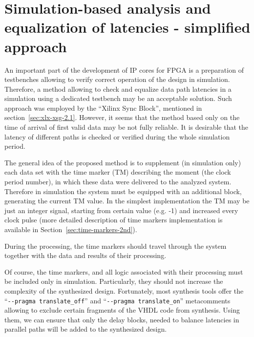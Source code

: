\documentclass[preprint,11pt]{elsarticle}
\begin{document}
\section{Simulation-based analysis and equalization of latencies - simplified approach}
An important part of the development of IP cores for FPGA is a preparation of 
testbenches allowing to verify correct operation of the design in simulation.
Therefore, a method allowing to check and equalize data path latencies in a simulation using
a dedicated testbench may be an acceptable solution.
Such approach was employed by the ``Xilinx Sync Block'', mentioned in section~\ref{sec:xlx-xsg-2.1}.
However, it seems that the method based only on the time of arrival of first valid data 
may be not fully reliable. It is desirable that the latency of different paths is checked or 
verified during the whole simulation period.

The general idea of the proposed method is to supplement (in simulation only) each data set with the time marker (TM) describing the moment (the clock period number), in which these data were delivered to the analyzed system.
Therefore in simulation the system must be equipped with an additional block, generating the current TM value.
In the simplest implementation the TM may be just an integer signal, starting from certain value (e.g. -1)
and increased every clock pulse\label{sec:time-markers-1st} (more detailed description of time markers
implementation is available in Section~\ref{sec:time-markers-2nd}).
	
During the processing, the time markers should travel through the system together 
with the data and results of their processing.

Of course, the time markers, and all logic associated with their processing must be included
only in simulation. Particularly, they should not increase the complexity of the synthesized design.
Fortunately, most synthesis tools offer the ``\verb|--pragma translate_off|'' and ``\verb|--pragma translate_on|'' metacomments allowing to exclude certain fragments of the VHDL code from synthesis.
Using them, we can ensure that only the delay blocks, needed to balance latencies in parallel 
paths will be added to the synthesized design.
\end{document}
